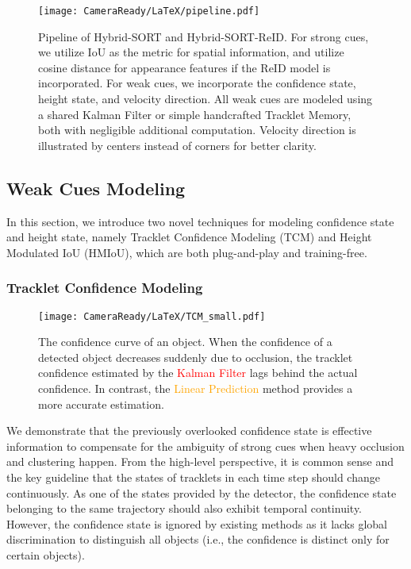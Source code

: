 \documentclass[letterpaper]{article} \usepackage{aaai23}  \usepackage{times}  \usepackage{helvet}  \usepackage{courier}  \usepackage[hyphens]{url}  \usepackage{graphicx} \urlstyle{rm} \def\UrlFont{\rm}  \usepackage{natbib}  \usepackage{caption} \frenchspacing  \setlength{\pdfpagewidth}{8.5in}  \setlength{\pdfpageheight}{11in}  \usepackage{algorithm}
\begin{document}
\begin{figure*}[t]
\centering
\texttt{[image: CameraReady/LaTeX/pipeline.pdf]} \caption{Pipeline of Hybrid-SORT and Hybrid-SORT-ReID. For strong cues, we utilize IoU as the metric for spatial information, and utilize cosine distance for appearance features if the ReID model is incorporated. For weak cues, we incorporate the confidence state, height state, and velocity direction. All weak cues are modeled using a shared Kalman Filter or simple handcrafted Tracklet Memory, both with negligible additional computation. Velocity direction is illustrated by centers instead of corners for better clarity.}
\label{pipeline}
\end{figure*}




\subsection{Weak Cues Modeling}
In this section, we introduce two novel techniques for modeling confidence state and height state, namely Tracklet Confidence Modeling (TCM) and Height Modulated IoU (HMIoU), which are both plug-and-play and training-free.

\subsubsection{Tracklet Confidence Modeling}

\begin{figure}[ht]
\centering
\texttt{[image: CameraReady/LaTeX/TCM\_small.pdf]} \caption{The confidence curve of an object. When the confidence of a \textcolor[RGB]{50, 205, 50}{detected} object decreases suddenly due to occlusion, the tracklet confidence estimated by the \textcolor{red}{Kalman Filter} lags behind the actual confidence. In contrast, the \textcolor{orange}{Linear Prediction} method provides a more accurate estimation.}
\label{TCM}
\end{figure}

We demonstrate that the previously overlooked confidence state is effective information to compensate for the ambiguity of strong cues when heavy occlusion and clustering happen. From the high-level perspective, it is common sense and the key guideline that the states of tracklets in each time step should change continuously. As one of the states provided by the detector, the confidence state belonging to the same trajectory should also exhibit temporal continuity. However, the confidence state is ignored by existing methods as it lacks global discrimination to distinguish all objects (i.e., the confidence is distinct only for certain objects). 
\end{document}
